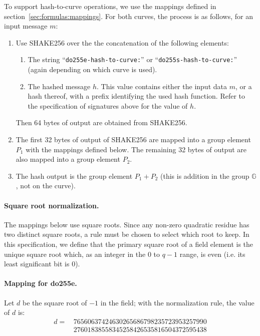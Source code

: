 \documentclass{llncs}
\newcommand{\bG}{\mathbb{G}}
\begin{document}
To support hash-to-curve operations, we use the mappings defined in
section~\ref{sec:formulas:mappings}. For both curves, the process is
as follows, for an input message $m$:
\begin{enumerate}

    \item Use SHAKE256 over the the concatenation of the following
    elements:
    \begin{enumerate}

        \item The string ``\verb+do255e-hash-to-curve:+''
        or ``\verb+do255s-hash-to-curve:+'' (again depending on
        which curve is used).

        \item The hashed message $h$. This value contains either the
        input data $m$, or a hash thereof, with a prefix identifying the
        used hash function. Refer to the specification of signatures
        above for the value of $h$.

    \end{enumerate}
    Then 64 bytes of output are obtained from SHAKE256.

    \item The first 32 bytes of output of SHAKE256 are mapped into a
    group element $P_1$ with the mappings defined below. The remaining
    32 bytes of output are also mapped into a group element $P_2$.

    \item The hash output is the group element $P_1 + P_2$ (this is
    addition in the group $\bG$, not on the curve).

\end{enumerate}

\paragraph{Square root normalization.} The mappings below use square roots.
Since any non-zero quadratic residue has two distinct square roots, a rule
must be chosen to select which root to keep. In this specification, we
define that the primary square root of a field element is the unique
square root which, as an integer in the $0$ to $q-1$ range, is even (i.e.
its least significant bit is 0).

\paragraph{Mapping for do255e.} Let $d$ be the square root of $-1$ in
the field; with the normalization rule, the value of $d$ is:
\begin{align*}
    d =&\,76560637424630265686798235723953257990 \\
       &\,27601838558345258426535816504372595438
\end{align*}
\end{document}
